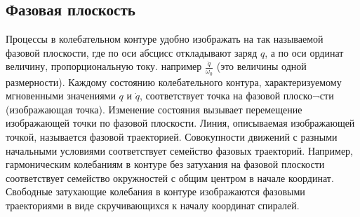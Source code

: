 \subsection{Фазовая плоскость} %

Процессы в колебательном контуре удобно изображать на так называемой фазовой плоскости, где по оси абсцисс откладывают заряд $q$, а по оси ординат величину, пропорциональную току.
например $\frac{\dot{q}}{\omega_0}$ (это величины одной размерности). Каждому
состоянию колебательного контура, характеризуемому мгновенными значениями $q$ и $\dot{q}$, соответствует точка на фазовой плоско¬сти (изображающая точка). Изменение состояния вызывает перемещение изображающей точки по фазовой плоскости. Линия, описываемая изображающей точкой, называется фазовой траекторией. Совокупности движений с разными начальными условиями соответствует семейство фазовых траекторий. Например, гармоническим колебаниям в контуре без затухания  на фазовой плоскости соответствует семейство окружностей с общим центром в начале координат. Свободные затухающие колебания в контуре изображаются фазовыми траекториями в виде скручивающихся к началу координат спиралей.
